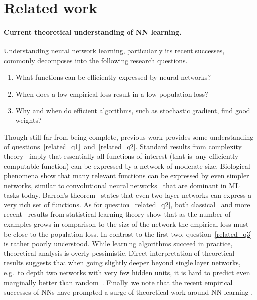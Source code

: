 
\section{Related work}
\label{sec:related}

\paragraph{Current theoretical understanding of NN learning.} Understanding
neural network learning, particularly its recent successes, commonly
decomposes into the following research questions.

\begin{enumerate}[label=(\roman*)]
  \item \label{related_q1} What functions can be efficiently expressed by
    neural networks?

  \item \label{related_q2} When does a low empirical loss result in a low
    population loss?

	\item \label{related_q3} Why and when do efficient algorithms, such
	as stochastic gradient, find good weights?

\end{enumerate}

\noindent Though still far from being complete, previous work provides some
understanding of questions~\ref{related_q1}~and~\ref{related_q2}. Standard
results from complexity theory~\cite{karp1980some} imply that essentially all
functions of interest (that is, any efficiently computable function) can be
expressed by a network of moderate size. Biological phenomena show that many
relevant functions can be expressed by even simpler networks, similar to
convolutional neural networks~\cite{lecun1998gradient} that are dominant in ML
tasks today. Barron's theorem~\cite{Barron93} states that even two-layer
networks can express a very rich set of functions. As for
question~\ref{related_q2}, both classical~\cite{BaumHa89, Bartlett98,
AnthonyBa99} and more recent~\cite{behnam2015norm,hardt2015train} results from
statistical learning theory show that as the number of examples grows in
comparison to the size of the network the empirical loss must be close to the
population loss. In contrast to the first two, question~\ref{related_q3} is
rather poorly understood. While learning algorithms succeed in practice,
theoretical analysis is overly pessimistic. Direct interpretation of
theoretical results suggests that when going slightly deeper beyond single
layer networks, e.g.\ to depth two networks with very few hidden units, it is
hard to predict even marginally better than random~\cite{KearnsVa89,
KlivansSh06, danielySh2014, daniely2013average, daniely2015complexity}.
Finally, we note that the recent empirical successes of NNs have prompted a
surge of theoretical work around NN learning \cite{safran2015basin,
andoni2014learning, arora2014provable, bruna2013invariant, neyshabur2015path,
livni2014computational, giryes2015deep, sedghi2014provable,
choromanska2015loss}.

